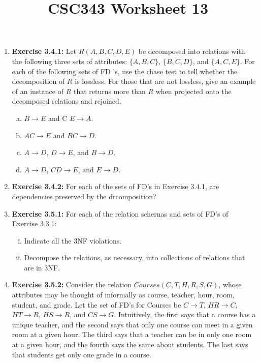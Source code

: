 \documentclass[12pt]{article}
\begin{document}
\title{CSC343 Worksheet 13}
\maketitle

\begin{enumerate}[1.]
    \item \textbf{Exercise 3.4.1:} Let $R(A, B, C, D, E)$ be decomposed into relations with the
    following three sets of attributes: $\{A, B, C\}$, $\{B, C, D\}$, and $\{A, C, E\}$. For each
    of the following sets of FD 's, use the chase test to tell whether the decomposition
    of $R$ is lossless. For those that are not lossless, give an example of an instance
    of $R$ that returns more than $R$ when projected onto the decomposed relations
    and rejoined.

    \begin{enumerate}[a)]
        \item $B \to E$ and C $E \to A$.
        \item $AC \to E$ and $BC \to D$.
        \item $A \to D$, $D \to E$, and $B \to D$.
        \item $A \to D$, $CD \to E$, and $E \to D$.
    \end{enumerate}

    \item \textbf{Exercise 3.4.2:} For each of the sets of FD's in Exercise 3.4.1,
    are dependencies preserved by the drcomposition?

    \item \textbf{Exercise 3.5.1:} For each of the relation schernas and sets of FD's of Exercise
    3.3.1:

    \bigskip

    \begin{enumerate}[i)]
        \item Indicate all the 3NF violations.
        \item Decompose the relations, as necessary, into collections of relations that are in 3NF.
    \end{enumerate}

    \item \textbf{Exercise 3.5.2:} Consider the relation $Courses(C, T, H, R, S, G)$,
    whose attributes may be thought of informally as course, teacher, hour, room, student,
    and grade. Let the set of FD's for Courses be $C\to T$, $HR\to C$, $HT\to R$,
    $HS\to R$, and $CS\to G$. Intuitively, the first says that a course has a unique
    teacher, and the second says that only one course can meet in a given room at
    a given hour. The third says that a teacher can be in only one room at a given
    hour, and the fourth says the same about students. The last says that students
    get only one grade in a course.


\end{enumerate}
\end{document}
